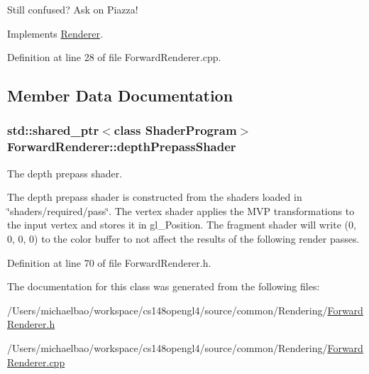 Still confused? Ask on Piazza! 

Implements \hyperlink{class_renderer_a38623da22aa718cfa41e2514ebd269f5}{Renderer}.



Definition at line 28 of file Forward\+Renderer.\+cpp.



\subsection{Member Data Documentation}
\hypertarget{class_forward_renderer_a8f703bc4c646416804bc82f4d220a648}{}
\subsubsection[{depth\+Prepass\+Shader}]{\setlength{\rightskip}{0pt plus 5cm}std\+::shared\+\_\+ptr$<$class {\bf Shader\+Program}$>$ Forward\+Renderer\+::depth\+Prepass\+Shader\hspace{0.3cm}{\ttfamily [protected]}}\label{class_forward_renderer_a8f703bc4c646416804bc82f4d220a648}


The depth prepass shader. 

The depth prepass shader is constructed from the shaders loaded in \char`\"{}shaders/required/pass\char`\"{}. The vertex shader applies the M\+V\+P transformations to the input vertex and stores it in gl\+\_\+\+Position. The fragment shader will write (0, 0, 0, 0) to the color buffer to not affect the results of the following render passes. 

Definition at line 70 of file Forward\+Renderer.\+h.



The documentation for this class was generated from the following files\+:\begin{DoxyCompactItemize}
\item 
/\+Users/michaelbao/workspace/cs148opengl4/source/common/\+Rendering/\hyperlink{_forward_renderer_8h}{Forward\+Renderer.\+h}\item 
/\+Users/michaelbao/workspace/cs148opengl4/source/common/\+Rendering/\hyperlink{_forward_renderer_8cpp}{Forward\+Renderer.\+cpp}\end{DoxyCompactItemize}
